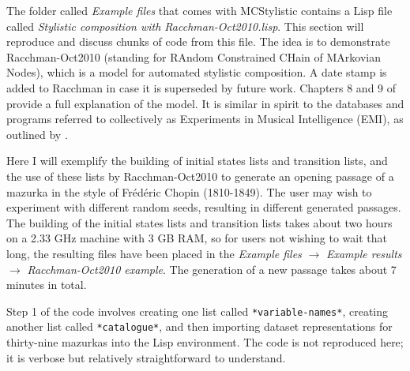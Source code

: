 The folder called \emph{Example files} that comes with MCStylistic contains a Lisp file called \emph{Stylistic composition with Racchman-Oct2010.lisp}. This section will reproduce and discuss chunks of code from this file. The idea is to demonstrate Racchman-Oct2010 (standing for RAndom Constrained CHain of MArkovian Nodes), which is a model for automated stylistic composition. A date stamp is added to Racchman in case it is superseded by future work. Chapters 8 and 9 of \citet{collins2011b} provide a full explanation of the model. It is similar in spirit to the databases and programs referred to collectively as
Experiments in Musical Intelligence (EMI), as outlined
by \citet*{cope1996,cope2001,cope2005}.

Here I will exemplify the building of initial states lists and transition lists, and the use of these lists by Racchman-Oct2010 to generate an opening passage of a
mazurka in the style of Fr\'ed\'eric Chopin (1810-1849). %
The user may wish to experiment with different random seeds, resulting in different generated passages. The building of the initial states lists and transition lists takes about two hours on a 2.33 GHz machine
with 3 GB RAM, so for users not wishing to
wait that long, the resulting files have been placed
in the \emph{Example files} $\rightarrow$ \emph{Example results} $\rightarrow$ \emph{Racchman-Oct2010 example}. The generation of a new passage takes about 7 minutes in total.

Step 1 of the code involves creating one list called \texttt{*variable-names*}, creating another list called \texttt{*catalogue*}, and then importing dataset representations for thirty-nine mazurkas into the Lisp environment. The code is not reproduced here; it is verbose but relatively straightforward to understand.

